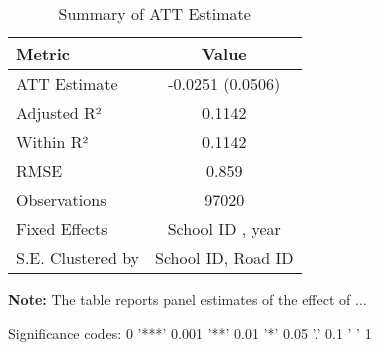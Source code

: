 \begin{table}[H]
\centering
\caption{Summary of ATT Estimate}
\label{tab:SA_math_10p}
 \begin{center}
 \begin{tabular}{lc}
 \toprule
Metric & Value \\
\midrule
ATT Estimate & -0.0251 (0.0506) \\
\hline 
 Adjusted R² & 0.1142 \\
Within R² & 0.1142 \\
RMSE & 0.859 \\
Observations & 97020 \\
\hline 
 Fixed Effects & School ID ,  year \\
S.E. Clustered by & School ID, Road ID \\
\bottomrule
\end{tabular}
 \end{center}\begin{tablenotes}
\small
\item \textbf{Note:} The table reports panel estimates of the effect of ...
\item Significance codes: 0 '***' 0.001 '**' 0.01 '*' 0.05 '.' 0.1 ' ' 1
\end{tablenotes}
\end{table}